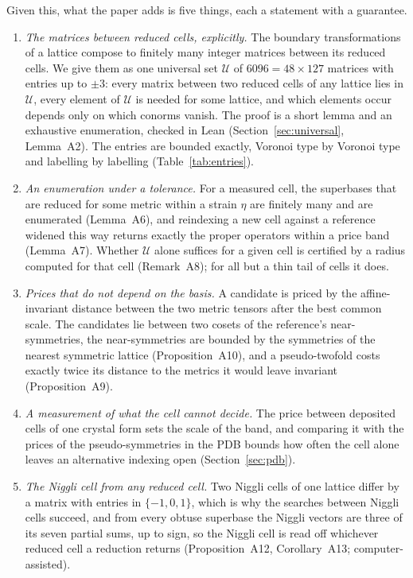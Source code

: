 Given this, what the paper adds is five things, each a statement with a guarantee.
\begin{enumerate}
\item \emph{The matrices between reduced cells, explicitly.} The boundary transformations of a lattice compose to finitely many integer matrices between its reduced cells. We give them as one universal set $\mathcal U$ of $6096=48\times127$ matrices with entries up to $\pm3$: every matrix between two reduced cells of any lattice lies in $\mathcal U$, every element of $\mathcal U$ is needed for some lattice, and which elements occur depends only on which conorms vanish. The proof is a short lemma and an exhaustive enumeration, checked in Lean (Section~\ref{sec:universal}, Lemma~A2). The entries are bounded exactly, Voronoi type by Voronoi type and labelling by labelling (Table~\ref{tab:entries}).
\item \emph{An enumeration under a tolerance.} For a measured cell, the superbases that are reduced for some metric within a strain $\eta$ are finitely many and are enumerated (Lemma~A6), and reindexing a new cell against a reference widened this way returns exactly the proper operators within a price band (Lemma~A7). Whether $\mathcal U$ alone suffices for a given cell is certified by a radius computed for that cell (Remark~A8); for all but a thin tail of cells it does.
\item \emph{Prices that do not depend on the basis.} A candidate is priced by the affine-invariant distance between the two metric tensors after the best common scale. The candidates lie between two cosets of the reference's near-symmetries, the near-symmetries are bounded by the symmetries of the nearest symmetric lattice (Proposition~A10), and a pseudo-twofold costs exactly twice its distance to the metrics it would leave invariant (Proposition~A9).
\item \emph{A measurement of what the cell cannot decide.} The price between deposited cells of one crystal form sets the scale of the band, and comparing it with the prices of the pseudo-symmetries in the PDB bounds how often the cell alone leaves an alternative indexing open (Section~\ref{sec:pdb}).
\item \emph{The Niggli cell from any reduced cell.} Two Niggli cells of one lattice differ by a matrix with entries in $\{-1,0,1\}$, which is why the searches between Niggli cells succeed, and from every obtuse superbase the Niggli vectors are three of its seven partial sums, up to sign, so the Niggli cell is read off whichever reduced cell a reduction returns (Proposition~A12, Corollary~A13; computer-assisted).
\end{enumerate}
